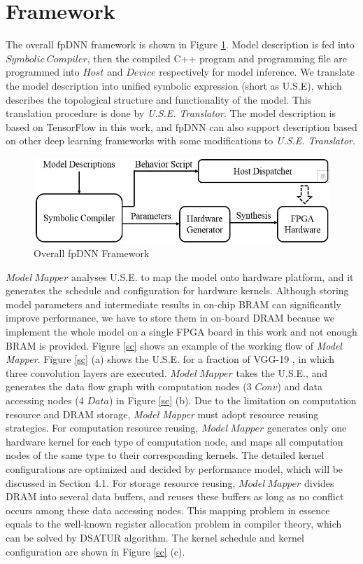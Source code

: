 \documentclass{acm_proc_article-sp-copy}
\begin{document}
\section{Framework}
The overall fpDNN framework is shown in Figure \ref{framework}. Model description is fed into $Symbolic\ Compiler$, then the compiled C++ program and programming file are programmed into $Host$ and $Device$ respectively for model inference. We translate the model description into unified symbolic expression (short as U.S.E), which describes the topological structure and functionality of the model. This translation procedure is done by \emph{U.S.E. Translator}.  The model description is based on TensorFlow in this work, and fpDNN can also support description based on other deep learning frameworks with some modifications to \emph{U.S.E. Translator}.

\begin{figure}
	\centering
	\includegraphics[width=1.0\linewidth]{./figure/framework.jpg}
	\caption{Overall fpDNN Framework}
	\label{framework}
\end{figure} 

$Model\ Mapper$ analyses U.S.E. to map the model onto hardware platform, and it generates the schedule and configuration for hardware kernels. 
Although storing model parameters and intermediate results in on-chip BRAM can significantly improve performance, we have to store them in on-board DRAM because 
we implement the whole model on a single FPGA board in this work and not enough BRAM is provided. Figure \ref{sc} shows an example of the working flow of \emph{Model Mapper}. Figure \ref{sc} (a) shows the U.S.E. for a fraction of VGG-19 \cite{vgg}, in which three convolution layers are executed. $Model\ Mapper$ takes the U.S.E., and generates the data flow graph with computation nodes (3 $Conv$) and data accessing nodes (4 $Data$) in Figure \ref{sc} (b). Due to the limitation on computation resource and DRAM storage, \emph{Model Mapper} must adopt resource reusing strategies. For computation resource reusing, $Model\ Mapper$ generates only one hardware kernel for each type of computation node, and maps all computation nodes of the same type to their corresponding kernels. The detailed kernel configurations are optimized and decided by performance model, which will be discussed in Section 4.1. For storage resource reusing, $Model\ Mapper$ divides DRAM into several data buffers, and reuses these buffers as long as no conflict occurs among these data accessing nodes. This mapping problem in essence equals to the well-known register allocation problem in compiler theory, which can be solved by DSATUR \cite{mapper} algorithm. The kernel schedule and kernel configuration are shown in Figure \ref{sc} (c).
\end{document}
